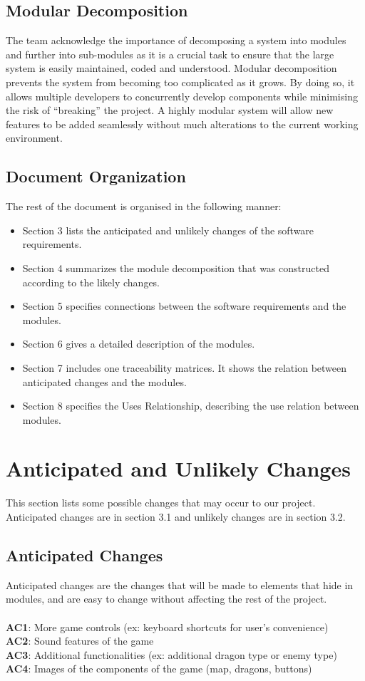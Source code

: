 \documentclass{article}
\begin{document}
\subsection{Modular Decomposition}
The team acknowledge the importance of decomposing a system into modules and further into sub-modules as it is a crucial task to ensure that the large system is easily maintained, coded and understood. Modular decomposition prevents the system from becoming too complicated as it grows. By doing so, it allows multiple developers to concurrently develop components while minimising the risk of “breaking” the project. A highly modular system will allow new features to be added seamlessly without much alterations to the current working environment.
\subsection{Document Organization}
The rest of the document is organised in the following manner:
\begin{itemize}
    \item Section 3 lists the anticipated and unlikely changes of the software requirements.
    \item Section 4 summarizes the module decomposition that was constructed according to the likely changes.
    \item Section 5 specifies connections between the software requirements and the modules. 
    \item Section 6 gives a detailed description of the modules.
    \item Section 7 includes one traceability matrices. It shows the relation between anticipated changes and the modules.
    \item Section 8 specifies the Uses Relationship, describing the use relation between modules.
\end{itemize}

\section{Anticipated and Unlikely Changes}
 This section lists some possible changes that may occur to our project. Anticipated changes are in section 3.1 and unlikely changes are in section 3.2.
 \subsection{Anticipated Changes}
 Anticipated changes are the changes that will be made to elements that hide in modules, and are easy to change without affecting the rest of the project.\\\\
\textbf{AC1}: More game controls (ex: keyboard shortcuts for user’s convenience)\\
\textbf{AC2}: Sound features of the game\\
\textbf{AC3}: Additional functionalities (ex: additional dragon type or enemy type)\\
\textbf{AC4}: Images of the components of the game (map, dragons, buttons)\\
\end{document}
